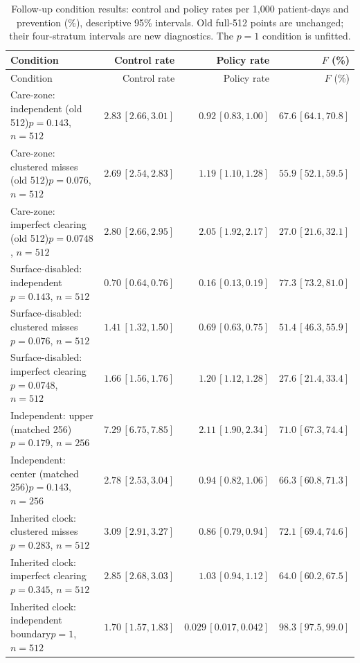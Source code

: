 \documentclass[11pt]{article}
\begin{document}
{\begin{longtable}{>{\raggedright\arraybackslash}p{.32\linewidth}rrr}
\caption{Follow-up condition results: control and policy rates per 1,000 patient-days and prevention (\%), descriptive 95\% intervals. Old full-512 points are unchanged; their four-stratum intervals are new diagnostics. The $p=1$ condition is unfitted.}\label{tab:rule-conditions}\\
\toprule
Condition & Control rate & Policy rate & $F$ (\%)\\\midrule\endfirsthead
Condition & Control rate & Policy rate & $F$ (\%)\\\midrule\endhead
Care-zone: independent (old 512)\newline $p=0.143$, $n=512$ & $2.83\,[2.66, 3.01]$ & $0.92\,[0.83, 1.00]$ & $67.6\,[64.1, 70.8]$\\
Care-zone: clustered misses (old 512)\newline $p=0.076$, $n=512$ & $2.69\,[2.54, 2.83]$ & $1.19\,[1.10, 1.28]$ & $55.9\,[52.1, 59.5]$\\
Care-zone: imperfect clearing (old 512)\newline $p=0.0748$, $n=512$ & $2.80\,[2.66, 2.95]$ & $2.05\,[1.92, 2.17]$ & $27.0\,[21.6, 32.1]$\\
Surface-disabled: independent\newline $p=0.143$, $n=512$ & $0.70\,[0.64, 0.76]$ & $0.16\,[0.13, 0.19]$ & $77.3\,[73.2, 81.0]$\\
Surface-disabled: clustered misses\newline $p=0.076$, $n=512$ & $1.41\,[1.32, 1.50]$ & $0.69\,[0.63, 0.75]$ & $51.4\,[46.3, 55.9]$\\
Surface-disabled: imperfect clearing\newline $p=0.0748$, $n=512$ & $1.66\,[1.56, 1.76]$ & $1.20\,[1.12, 1.28]$ & $27.6\,[21.4, 33.4]$\\
Independent: upper (matched 256)\newline $p=0.179$, $n=256$ & $7.29\,[6.75, 7.85]$ & $2.11\,[1.90, 2.34]$ & $71.0\,[67.3, 74.4]$\\
Independent: center (matched 256)\newline $p=0.143$, $n=256$ & $2.78\,[2.53, 3.04]$ & $0.94\,[0.82, 1.06]$ & $66.3\,[60.8, 71.3]$\\
Inherited clock: clustered misses\newline $p=0.283$, $n=512$ & $3.09\,[2.91, 3.27]$ & $0.86\,[0.79, 0.94]$ & $72.1\,[69.4, 74.6]$\\
Inherited clock: imperfect clearing\newline $p=0.345$, $n=512$ & $2.85\,[2.68, 3.03]$ & $1.03\,[0.94, 1.12]$ & $64.0\,[60.2, 67.5]$\\
Inherited clock: independent boundary\newline $p=1$, $n=512$ & $1.70\,[1.57, 1.83]$ & $0.029\,[0.017, 0.042]$ & $98.3\,[97.5, 99.0]$\\
\bottomrule\end{longtable}

}
\end{document}
